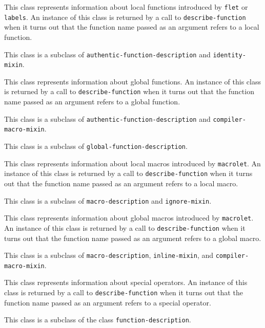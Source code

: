 This class represents information about local functions introduced by
\texttt{flet} or \texttt{labels}.  An instance of this class is
returned by a call to \texttt{describe-function} when it turns out that
the function name passed as an argument refers to a local function.

This class is a subclass of \texttt{authentic-function-description} and
\texttt{identity-mixin}.

{\footnotesize
{}
}

This class represents information about global functions.  An instance
of this class is returned by a call to \texttt{describe-function} when it
turns out that the function name passed as an argument refers to a
global function.

This class is a subclass of \texttt{authentic-function-description} and
\texttt{compiler-macro-mixin}.

{\footnotesize
{}
}

This class is a subclass of \texttt{global-function-description}.

{\footnotesize
{}
}

This class represents information about local macros introduced by
\texttt{macrolet}.  An instance of this class is returned by a call to
\texttt{describe-function} when it turns out that the function name passed
as an argument refers to a local macro.

This class is a subclass of \texttt{macro-description} and
\texttt{ignore-mixin}.

{\footnotesize
{}
}

This class represents information about global macros introduced by
\texttt{macrolet}.  An instance of this class is returned by a call to
\texttt{describe-function} when it turns out that the function name passed
as an argument refers to a global macro.

This class is a subclass of \texttt{macro-description},
\texttt{inline-mixin}, and \texttt{compiler-macro-mixin}.

{\footnotesize
{}
}

This class represents information about special operators.  An
instance of this class is returned by a call to \texttt{describe-function}
when it turns out that the function name passed as an argument refers
to a special operator.

This class is a subclass of the class \texttt{function-description}.

